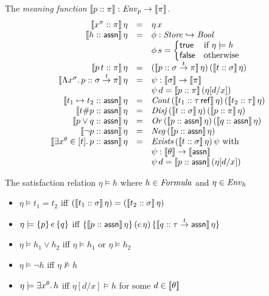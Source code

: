 \documentclass[12pt,a4paper]{report}
\newcommand{\Neg}{\nstyle{Neg}}
\newcommand{\Or}{\nstyle{Or}}
\newcommand{\Cont}{\nstyle{Cont}}
\newcommand{\Disj}{\nstyle{Disj}}
\newcommand{\Exists}{\nstyle{Exists}}
\begin{document}
\noindent The {\em meaning function} $\llbracket p\mathrel{::}\pi\rrbracket: \mathit{Env}_p \to \llbracket\pi\rrbracket$.
\[\begin{array}{rcl}
  \semantic{\tj{x^\pi}{\pi}}\,\eta 
    &=& \eta\,x \\
  \semantic{\tj{h}{\tassn}}\,\eta
    &=& \phi:\Store \pto \Bool \\
    & & \phi\,s = \bcase
                    \true   & \text{if } \eta \models h \\
                    \false  & \text{otherwise}
                  \ecase \\
  \semantic{\tj{\app{p}{t}}{\pi}}\,\eta
    &=& (\semantic{\tj{p}{\ttarrow{\sigma}{\pi}}}\,\eta)\,
        (\semantic{\tj{t}{\sigma}}\,\eta) \\
  \semantic{\tj{\tabstr{x^\sigma}{p}}{\ttarrow{\sigma}{\pi}}}\,\eta
    &=& \psi: \semantic{\sigma} \to \semantic{\pi} \\
    & & \psi\,d = \semantic{\tj{p}{\pi}}\,(\eta[d/x]) \\
  \semantic{\tj{t_1 \mapsto t_2}{\tassn}}\,\eta 
    &=& \Cont\,(\semantic{\tj{t_1}{\tref{\tau}}}\,\eta)\,(\semantic{\tj{t_2}{\tau}}\,\eta) \\
  \semantic{\tj{t \# p}{\tassn}}\,\eta
    &=& \Disj\,(\semantic{\tj{t}{\sigma}}\,\eta)\,(\semantic{\tj{p}{\pi}}\,\eta) \\
  \semantic{\tj{p \vee q}{\tassn}}\,\eta
    &=& \Or\,(\semantic{\tj{p}{\tassn}}\,\eta)\,(\semantic{\tj{q}{\tassn}}\,\eta) \\
  \semantic{\tj{\neg p}{\tassn}}\,\eta 
    &=& \Neg\,(\semantic{\tj{p}{\tassn}}\,\eta) \\
  \semantic{\tj{\qbex{x^\theta}{t}{p}}{\tassn}}\,\eta
    &=& \Exists\,(\semantic{\tj{t}{\sigma}}\,\eta)\,\psi \text{ with} \\
    & & \psi: \semantic{\theta} \to \semantic{\tassn} \\
    & & \psi\,d = \semantic{\tj{p}{\tassn}}\,(\eta[d/x])
\end{array}\]

\noindent The satisfaction relation $\eta \models h$ where $h \in \mathit{Formula}$ and $\eta \in \mathit{Env}_h$
\begin{itemize}
  \item $\eta \models t_1 = t_2$ iff $(\llbracket t_1\mathrel{::}\sigma\rrbracket\,\eta) = (\llbracket t_2\mathrel{::}\sigma\rrbracket\,\eta)$

  \item $\eta \models \{p\}\,e\,\{q\}$ iff
        $\{\llbracket p\mathrel{::}\mathsf{assn}\rrbracket\,\eta\}\,(e\,\eta)\,\{\llbracket q\mathrel{::}\tau\stackrel{t}{\to}\mathsf{assn}\rrbracket\,\eta\}$

  \item $\eta \models h_1 \vee h_2$ iff $\eta \models h_1$ or $\eta \models h_2$

  \item $\eta \models \neg h$ iff $\eta \not\models h$
  
  \item $\eta \models \exists x^\theta.\,h$ iff $\eta[d/x] \models h$ for some $d \in \llbracket\theta\rrbracket$
\end{itemize}
\end{document}
